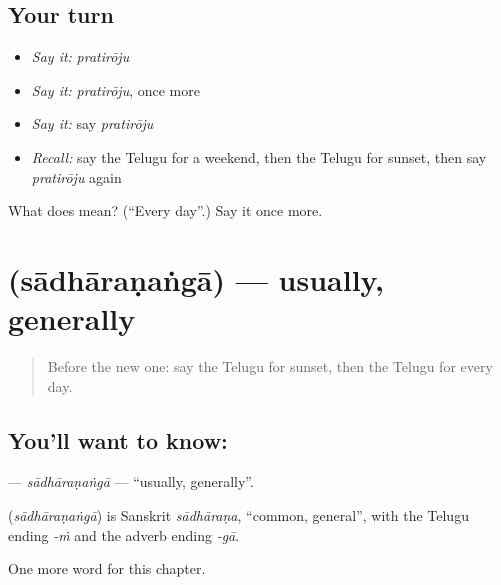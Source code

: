 \subsection*{Your turn}
\begin{itemize}
\raggedright
  \item \emph{Say it:} \emph{pratirōju}
  \item \emph{Say it:} \emph{pratirōju}, once more
  \item \emph{Say it:} say \emph{pratirōju}
  \item \emph{Recall:} say the Telugu for a weekend, then the Telugu for sunset, then say \emph{pratirōju} again
\end{itemize}

\begin{tcolorbox}[breakable,colback=teal!4,colframe=teal!35!black,title={Before you move on}]
What does  mean? (\textquotedblleft{}Every day\textquotedblright{}.) Say it once more.
\end{tcolorbox}
\section[\texorpdfstring{\te{సాధారణంగా} (sādhāraṇaṅgā)}{సాధారణంగా (sādhāraṇaṅgā)}]{ (sādhāraṇaṅgā) — usually, generally}

\label{lesson:TE-C171-sadharananga}



\begin{quote}
Before the new one: say the Telugu for sunset, then the Telugu for every day.
\end{quote}

\subsection*{You'll want to know: }
\textbf{} — \emph{sādhāraṇaṅgā} — \textquotedblleft{}usually, generally\textquotedblright{}.

\begin{cousinweb}
\textbf{} (\emph{sādhāraṇaṅgā}) is Sanskrit \emph{sādhāraṇa}, \textquotedblleft{}common, general\textquotedblright{}, with the Telugu ending \emph{-ṁ} and the adverb ending \emph{-gā}.
\end{cousinweb}

\begin{grammarlens}[title={What you've built}]
One more word for this chapter.
\end{grammarlens}

